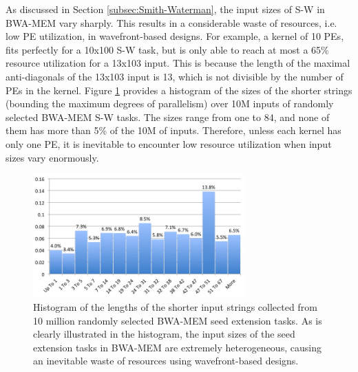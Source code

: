 As discussed in Section \ref{subsec:Smith-Waterman}, the input sizes of S-W in BWA-MEM vary sharply. 
This results in a considerable waste of resources, i.e. low PE utilization, in wavefront-based designs. 
For example, a kernel of 10 PEs, fits perfectly for a 10x100 S-W task, but is only able to reach at most a 65\% resource utilization for a 13x103 input. 
This is because the length of the maximal anti-diagonals of the 13x103 input is 13, 
which is not divisible by the number of PEs in the kernel.
Figure \ref{fig:F4C2} provides a histogram of the sizes of the shorter strings (bounding the maximum degrees of parallelism) over 10M inputs of randomly selected BWA-MEM S-W tasks. 
The sizes range from one to 84, and none of them has more than 5\% of the 10M of inputs. 
Therefore, unless each kernel has only one PE,
it is inevitable to encounter low resource utilization when input sizes vary enormously.
\begin{figure}[!hbt]
	\begin{center}
		\includegraphics[width=3.2in]{Figures/Figure4C2.jpg}
		\caption {Histogram of the lengths of the shorter input strings collected from 10 million randomly selected BWA-MEM seed extension tasks. As is clearly illustrated in the histogram, the input sizes of the seed extension tasks in BWA-MEM are extremely heterogeneous, causing an inevitable waste of resources using wavefront-based designs.}
		\label{fig:F4C2}
	\end{center}
\end{figure}
